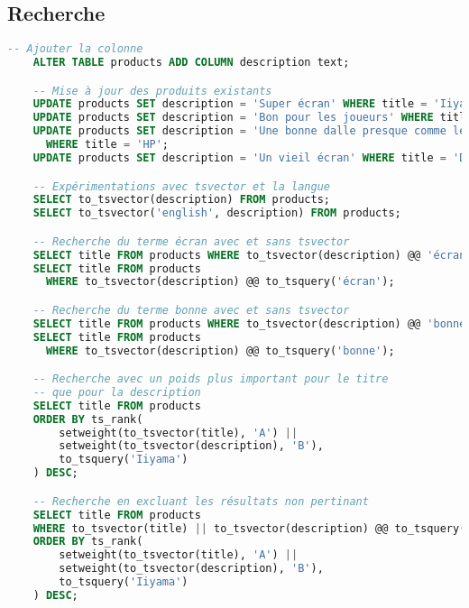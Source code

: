 \documentclass[a4paper,10pt]{article}
\begin{document}
  \subsection{Recherche}
    \begin{lstlisting}[language=SQL, basicstyle=\ttfamily, gobble=4, tabsize=2, showstringspaces=false]
    -- Ajouter la colonne
    ALTER TABLE products ADD COLUMN description text;

    -- Mise à jour des produits existants
    UPDATE products SET description = 'Super écran' WHERE title = 'Iiyama';
    UPDATE products SET description = 'Bon pour les joueurs' WHERE title = 'Acer';
    UPDATE products SET description = 'Une bonne dalle presque comme le Iiyama'
      WHERE title = 'HP';
    UPDATE products SET description = 'Un vieil écran' WHERE title = 'Dell';

    -- Expérimentations avec tsvector et la langue
    SELECT to_tsvector(description) FROM products;
    SELECT to_tsvector('english', description) FROM products;

    -- Recherche du terme écran avec et sans tsvector
    SELECT title FROM products WHERE to_tsvector(description) @@ 'écran';
    SELECT title FROM products
      WHERE to_tsvector(description) @@ to_tsquery('écran');

    -- Recherche du terme bonne avec et sans tsvector
    SELECT title FROM products WHERE to_tsvector(description) @@ 'bonne';
    SELECT title FROM products
      WHERE to_tsvector(description) @@ to_tsquery('bonne');

    -- Recherche avec un poids plus important pour le titre
    -- que pour la description
    SELECT title FROM products
    ORDER BY ts_rank(
        setweight(to_tsvector(title), 'A') ||
        setweight(to_tsvector(description), 'B'),
        to_tsquery('Iiyama')
    ) DESC;

    -- Recherche en excluant les résultats non pertinant
    SELECT title FROM products
    WHERE to_tsvector(title) || to_tsvector(description) @@ to_tsquery('Iiyama')
    ORDER BY ts_rank(
        setweight(to_tsvector(title), 'A') ||
        setweight(to_tsvector(description), 'B'),
        to_tsquery('Iiyama')
    ) DESC;
    \end{lstlisting}
\end{document}
